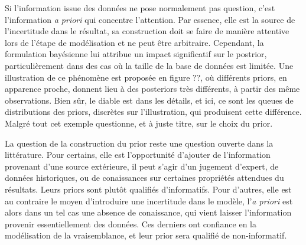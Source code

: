 
Si l'information issue des données ne pose normalement pas question, c'est l'information \emph{a priori} qui concentre l'attention. Par essence, elle est la source de l'incertitude dans le résultat,  sa construction doit se faire de manière attentive lors de l'étape de modélisation et ne peut être arbitraire. 
Cependant, la formulation bayésienne lui attribue un impact significatif sur le postrior, particulièrement dans des cas où la taille de la base de données est limitée. Une illustration de ce phénomène est proposée en figure ??, où différents priors, en apparence proche, donnent lieu à des posteriors très différents, à partir des même observations.
Bien sûr, le diable est dans les détails, et ici, ce sont les queues de distributions des priors, discrètes sur l'illustration, qui produisent cette différence. Malgré tout cet exemple questionne, et à juste titre, sur le choix du prior.


La question de la construction du prior reste une question ouverte dans la littérature. %
Pour certains, elle est l'opportunité d'ajouter de l'information provenant d'une source extérieure, il peut s'agir d'un jugement d'expert, de données historiques, ou de conaissances sur certaines propriétés attendues du résultats. Leurs priors sont plutôt qualifiés d'informatifs.
Pour d'autres, elle est au contraire le moyen d'introduire une incertitude dans le modèle, l'\emph{a priori} est alors dans un tel cas une absence de conaissance, qui vient laisser l'information provenir essentiellement des données. Ces derniers ont confiance en la modélisation de la vraisemblance, et leur prior sera qualifié de non-informatif.


